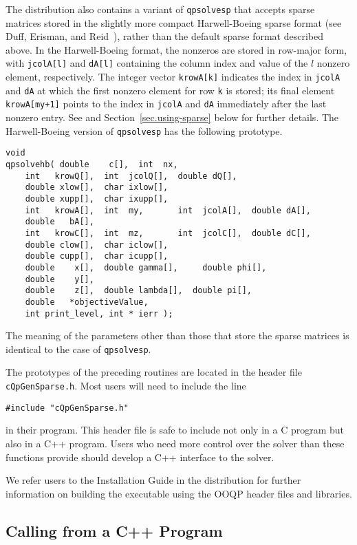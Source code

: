 The distribution also contains a variant of \texttt{qpsolvesp} that
accepts sparse matrices stored in the slightly more compact
Harwell-Boeing sparse format (see Duff, Erisman, and
Reid~\cite{DufER86}), rather than the default sparse format described
above. In the Harwell-Boeing format, the nonzeros are stored in
row-major form, with \texttt{jcolA[l]} and \texttt{dA[l]} containing
the column index and value of the $l$ nonzero element, respectively.
The integer vector \texttt{krowA[k]} indicates the index in
\texttt{jcolA} and \texttt{dA} at which the first nonzero element for
row \texttt{k} is stored; its final element \texttt{krowA[my+1]}
points to the index in \texttt{jcolA} and \texttt{dA} immediately
after the last nonzero entry. See \cite{DufER86} and
Section~\ref{sec.using-sparse} below for further details.  The
Harwell-Boeing version of \texttt{qpsolvesp} has the following
prototype.
\begin{verbatim}
void 
qpsolvehb( double    c[],  int  nx,
    int   krowQ[],  int  jcolQ[],  double dQ[],
    double xlow[],  char ixlow[], 
    double xupp[],  char ixupp[],
    int   krowA[],  int  my,       int  jcolA[],  double dA[],
    double   bA[],
    int   krowC[],  int  mz,       int  jcolC[],  double dC[],
    double clow[],  char iclow[],
    double cupp[],  char icupp[],
    double    x[],  double gamma[],     double phi[],
    double    y[],
    double    z[],  double lambda[],  double pi[],
    double   *objectiveValue,
    int print_level, int * ierr );
\end{verbatim}
The meaning of the parameters other than those that store the sparse
matrices is identical to the case of \texttt{qpsolvesp}.



The prototypes of the preceding routines are located in the header
file \texttt{cQpGenSparse.h}.  Most users will need to include the
line
\begin{verbatim}
#include "cQpGenSparse.h"
\end{verbatim}
in their program. This header file is safe to include not only in a C
program but also in a C++ program. Users who need more control over
the solver than these functions provide should develop a C++ interface
to the solver.

We refer users to the Installation Guide in the distribution for
further information on building the executable using the OOQP header
files and libraries.


\subsection{Calling from a C++ Program}
\label{embedding-cplusplus}

